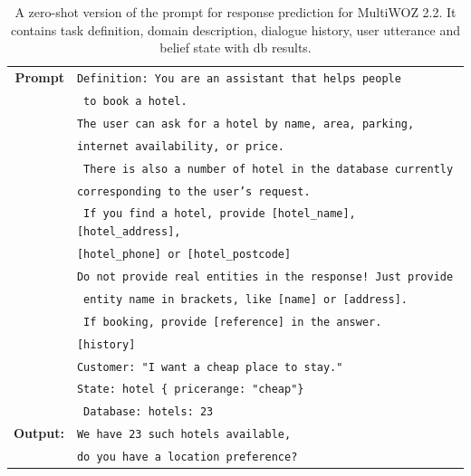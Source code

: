 \begin{table}[tp]
    \centering\small
    \begin{tabular}{rl}
      \toprule
      \textbf{Prompt} & \texttt{{\color{cyan!80!yellow!80!black!100 }Definition: You are an assistant that helps people}} \\
      & \texttt{{\color{cyan!80!yellow!80!black!100} to book a hotel.}} \\
& \texttt{{\color{green!100!yellow!70!black!100 }The user can ask for a hotel by name, area, parking, }}\\
& \texttt{{\color{green!100!yellow!70!black!100 }internet availability, or price.}} \\
& \texttt{{\color{green!100!yellow!70!black!100 } There is also a number of hotel in the database currently }} \\
& \texttt{{\color{green!100!yellow!70!black!100 }corresponding to the user's request. }}\\
& \texttt{{\color{green!100!yellow!70!black!100 } If you find a hotel, provide [hotel\_name], [hotel\_address], }} \\
& \texttt{{\color{green!100!yellow!70!black!100 }[hotel\_phone] or [hotel\_postcode]}} \\
& \texttt{{\color{green!100!yellow!70!black!100 }Do not provide real entities in the response! Just provide}}\\
& \texttt{{\color{green!100!yellow!70!black!100 } entity name in brackets, like [name] or [address].} }\\
& \texttt{{\color{cyan!80!yellow!80!black!100 } If booking, provide [reference] in the answer. }} \\
& \texttt{{\color{red!100!yellow!70!black!100!}[history] }} \\
& \texttt{{\color{orange!50!yellow!90!black!100!}Customer: "I want a cheap place to stay." }}\\
& \texttt{{\color{magenta!100!yellow!70!black!100!}State: hotel \{ pricerange: "cheap"\} }} \\
& \texttt{{\color{magenta!100!yellow!70!black!100!} Database: hotels: 23 }}\\
      \midrule
      \textbf{Output:} & \texttt{We have 23 such hotels available,} \\
      & \texttt{do you have a location preference?} \\
      \bottomrule
  \end{tabular}
  \caption{A zero-shot version of the prompt for response prediction for MultiWOZ 2.2.
  It contains {\color{cyan!80!yellow!80!black!100} task definition},  {\color{green!100!yellow!70!black!100!}domain description}, {\color{red!100!yellow!70!black!100!} dialogue history}, {\color{orange!50!yellow!90!black!100!} user utterance} and {\color{magenta!100!yellow!70!black!100!} belief state with db results}.}
  \label{07_tab:zero-shot-response}
\end{table}
